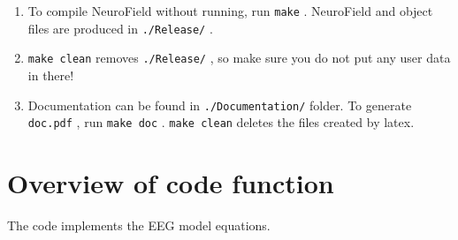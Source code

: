 \documentclass[12pt,a4paper]{article}
\newcommand{\type}[1]{ {\small\small\tt #1} }
\begin{document}
\begin{enumerate}
\begin{enumerate}
\end{enumerate}

\item To compile NeuroField without running, run \type{make}. NeuroField and object files are produced in \type{./Release/}.

\item \type{make clean} removes \type{./Release/}, so make sure you do not put any user data in there! 

\item Documentation can be found in \type{./Documentation/} folder. To generate \type{doc.pdf}, run \type{make doc}. \type{make clean} deletes the files created by latex.

\end{enumerate}

\section{Overview of code function}

The code implements the EEG model equations.
\end{document}
